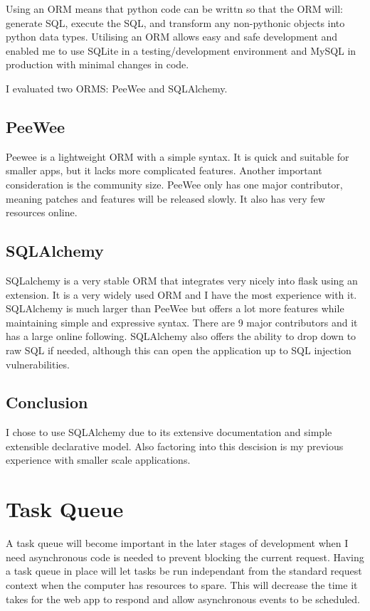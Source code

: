\documentclass[a4paper,oneside,12pt]{report}
\begin{document}
	Using an ORM means that python code can be writtn so that the ORM will: generate SQL, execute the SQL, and transform any non-pythonic objects into python data types. Utilising an ORM allows easy and safe development and enabled me to use SQLite in a testing/development environment and MySQL in production with minimal changes in code.
	
	I evaluated two ORMS: PeeWee and SQLAlchemy.

	\subsection{PeeWee}
	Peewee is a lightweight ORM with a simple syntax. It is quick and suitable for smaller apps, but it lacks more complicated features. Another important consideration is the community size. PeeWee only has one major contributor, meaning patches and features will be released slowly. It also has very few resources online.

	\subsection{SQLAlchemy}
	SQLalchemy is a very stable ORM that integrates very nicely into flask using an extension. It is a very widely used ORM and I have the most experience with it. SQLAlchemy is much larger than PeeWee but offers a lot more features while maintaining simple and expressive syntax. There are 9 major contributors and it has a large online following. SQLAlchemy also offers the ability to drop down to raw SQL if needed, although this can open the application up to SQL injection vulnerabilities.
	
	\subsection{Conclusion}
	I chose to use SQLAlchemy due to its extensive documentation and simple extensible declarative model. Also factoring into this descision is my previous experience with smaller scale applications.

	\section{Task Queue}
	A task queue will become important in the later stages of development when I need asynchronous code is needed to prevent blocking the current request. Having a task queue in place will let tasks be run independant from the standard request context when the computer has resources to spare. This will decrease the time it takes for the web app to respond and allow asynchronous events to be scheduled.
\end{document}
